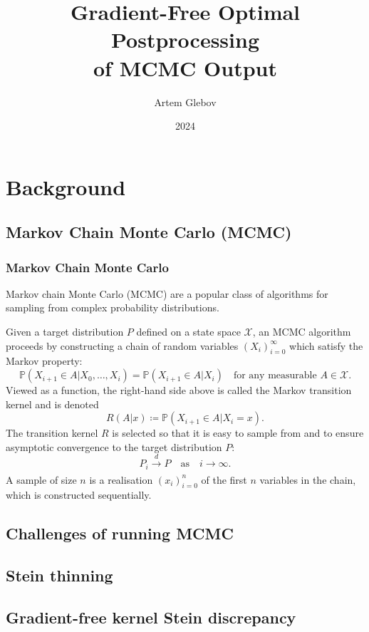 \documentclass{beamer}
\title[Gradient-Free Optimal Postprocessing]{Gradient-Free Optimal Postprocessing \\ of MCMC Output}
\author{Artem Glebov}
\institute{King's College London}
\date{2024}
\begin{document}
\frame{\titlepage}

\section{Background}

\subsection{Markov Chain Monte Carlo (MCMC)}

\begin{frame}
\frametitle{Markov Chain Monte Carlo}
Markov chain Monte Carlo (MCMC) are a popular class of algorithms for sampling from complex probability distributions.

Given a target distribution $P$ defined on a state space $\mathcal{X}$, an MCMC algorithm proceeds by constructing a chain of random variables $(X_i)_{i=0}^\infty$  which satisfy the Markov property:
\begin{equation*}
\mathbb{P}(X_{i+1}\in A | X_0, \dots, X_i) = \mathbb{P}(X_{i+1}\in A | X_i) \quad\text{for any measurable } A \in \mathcal{X}.
\end{equation*}
Viewed as a function, the right-hand side above is called the Markov transition kernel and is denoted 
\begin{equation}
R(A | x) \coloneq \mathbb{P}(X_{i+1}\in A | X_i = x).
\end{equation}
The transition kernel $R$ is selected so that it is easy to sample from and to ensure asymptotic convergence to the target distribution $P$:
\begin{equation*}
P_i \xrightarrow[]{d} P \quad\text{as}\quad i \to \infty.
\end{equation*}
A sample of size $n$ is a realisation $(x_i)_{i=0}^n$ of the first $n$ variables in the chain, which is constructed sequentially.
\end{frame}

\subsection{Challenges of running MCMC}

\subsection{Stein thinning}

\subsection{Gradient-free kernel Stein discrepancy}
\end{document}

